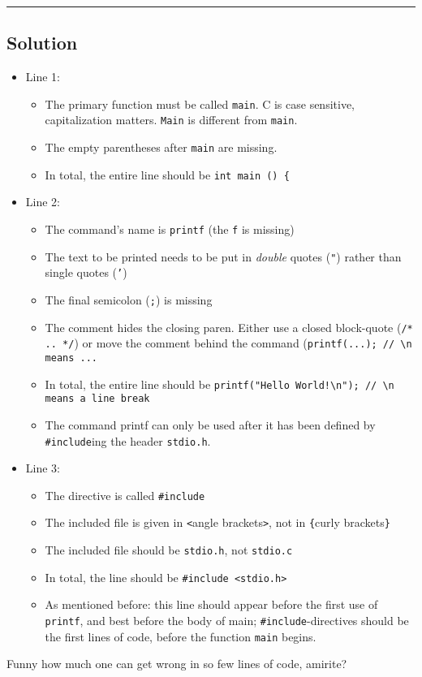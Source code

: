 \rule{\linewidth}{0.1mm}
\subsection*{Solution}
\begin{itemize}
\item Line 1:
	\begin{itemize}
	\item The primary function must be called \texttt{main}. C is case sensitive, \ie capitalization matters. \texttt{Main} is different from \texttt{main}.
	\item The empty parentheses after \texttt{main} are missing.
	\item In total, the entire line should be \texttt{int main () \{}
	\end{itemize}
\item Line 2:
	\begin{itemize}
	\item The command's name is \texttt{printf} (the \texttt{f} is missing)
	\item The text to be printed needs to be put in \emph{double} quotes (\texttt{"}) rather than single quotes (\texttt{'})
	\item The final semicolon (\texttt{;}) is missing
	\item The comment hides the closing paren. Either use a closed block-quote (\texttt{/* .. */}) or move the comment behind the command (\texttt{printf(...); // \textbackslash n means ...}
	\item In total, the entire line should be \texttt{printf("Hello World!\textbackslash n"); // \textbackslash n means  a line break}
	\item The command printf can only be used after it has been defined by \texttt{\#include}ing the header \texttt{stdio.h}.
	\end{itemize}
\item Line 3:
	\begin{itemize}
	\item The directive is called \texttt{\#include}
	\item The included file is given in \texttt{<}angle brackets\texttt{>}, not in \texttt{\{}curly brackets\texttt{\}}
	\item The included file should be \texttt{stdio.h}, not \texttt{stdio.c}
	\item In total, the line should be \texttt{\#include <stdio.h>}
	\item As mentioned before: this line should appear before the first use of \texttt{printf}, and best before the body of main; \texttt{\#include}-directives should be the 
		first lines of code, before the function \texttt{main} begins.
	\end{itemize}
\end{itemize}

Funny how much one can get wrong in so few lines of code, amirite?
